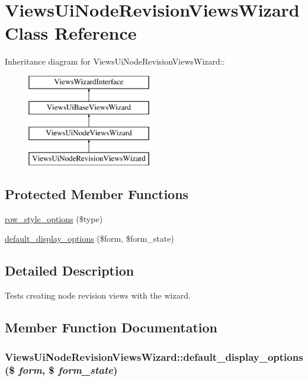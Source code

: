 \hypertarget{classViewsUiNodeRevisionViewsWizard}{
\section{ViewsUiNodeRevisionViewsWizard Class Reference}
\label{classViewsUiNodeRevisionViewsWizard}
}
Inheritance diagram for ViewsUiNodeRevisionViewsWizard::\begin{figure}[H]
\begin{center}
\leavevmode
\includegraphics[height=4cm]{classViewsUiNodeRevisionViewsWizard}
\end{center}
\end{figure}
\subsection*{Protected Member Functions}
\begin{DoxyCompactItemize}
\item 
\hyperlink{classViewsUiNodeRevisionViewsWizard_a920d30184506f8f5a9c8db643742b329}{row\_\-style\_\-options} (\$type)
\item 
\hyperlink{classViewsUiNodeRevisionViewsWizard_ac51b61da9be3e950479313ffb4135546}{default\_\-display\_\-options} (\$form, \$form\_\-state)
\end{DoxyCompactItemize}


\subsection{Detailed Description}
Tests creating node revision views with the wizard. 

\subsection{Member Function Documentation}
\hypertarget{classViewsUiNodeRevisionViewsWizard_ac51b61da9be3e950479313ffb4135546}{
\subsubsection[{default\_\-display\_\-options}]{\setlength{\rightskip}{0pt plus 5cm}ViewsUiNodeRevisionViewsWizard::default\_\-display\_\-options (\$ {\em form}, \/  \$ {\em form\_\-state})}}
\label{classViewsUiNodeRevisionViewsWizard_ac51b61da9be3e950479313ffb4135546}


